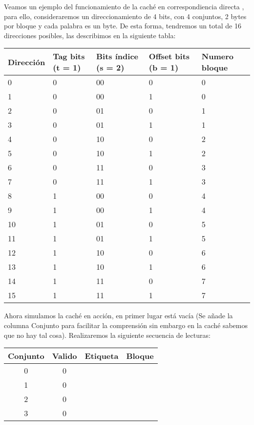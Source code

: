 \begin{ejemplo}
Veamos un ejemplo del funcionamiento de la caché en correspondiencia directa
, para ello, consideraremos un direccionamiento de 4 bits, con 4 conjuntos, 2 
bytes por bloque y cada palabra es un byte.
De esta forma, tendremos un total de 16 direcciones posibles, las describimos en la siguiente tabla:
    \begin{center}
\begin{tabular}{p{2cm} p{2cm} p{2cm} p{2cm} p{2cm}}
\hline
\textbf{Dirección} & \textbf{Tag bits (t = 1)} & \textbf{Bits índice (s = 2)} & \textbf{Offset bits (b = 1)} & \textbf{Numero bloque} \\
\hline
0  & 0 & 00 & 0 &  0 \\
1  & 0 & 00 & 1 &  0 \\
2  & 0 & 01 & 0 &  1 \\
3  & 0 & 01 & 1 &  1 \\
4  & 0 & 10 & 0 &  2 \\
5  & 0 & 10 & 1 &  2 \\
6  & 0 & 11 & 0 &  3 \\
7  & 0 & 11 & 1 &  3 \\
8  & 1 & 00 & 0 &  4 \\
9  & 1 & 00 & 1 &  4 \\
10 & 1 & 01 & 0 &  5 \\
11 & 1 & 01 & 1 &  5 \\
12 & 1 & 10 & 0 &  6 \\
13 & 1 & 10 & 1 &  6 \\
14 & 1 & 11 & 0 &  7 \\
15 & 1 & 11 & 1 &  7 \\
\hline
\end{tabular}
\end{center}
Ahora simulamos la caché en acción, en primer lugar está vacía (Se añade la columna Conjunto para facilitar la comprensión sin embargo en la caché sabemos que no hay tal cosa). Realizaremos la siguiente secuencia de lecturas:
\begin{center}
\begin{tabular}{cccc}
    Conjunto & Valido & Etiqueta & Bloque \\
    \hline
    0 & 0 & & \\
    1 & 0 & & \\
    2 & 0 & & \\
    3 & 0 & & \\
\end{tabular}
\end{center}

\end{ejemplo}
